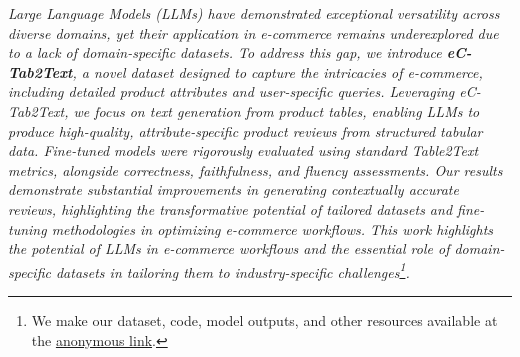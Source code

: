 \textit{Large Language Models (LLMs) have demonstrated exceptional versatility across diverse domains, yet their application in e-commerce remains underexplored due to a lack of domain-specific datasets. To address this gap, we introduce \textbf{eC-Tab2Text}, a novel dataset designed to capture the intricacies of e-commerce, including detailed product attributes and user-specific queries. Leveraging eC-Tab2Text, we focus on text generation from product tables, enabling LLMs to produce high-quality, attribute-specific product reviews from structured tabular data. Fine-tuned models were rigorously evaluated using standard Table2Text metrics, alongside correctness, faithfulness, and fluency assessments. Our results demonstrate substantial improvements in generating contextually accurate reviews, highlighting the transformative potential of tailored datasets and fine-tuning methodologies in optimizing e-commerce workflows. This work highlights the potential of LLMs in e-commerce workflows and the essential role of domain-specific datasets in tailoring them to industry-specific challenges\footnote{We make our dataset, code, model outputs, and other resources available at the \href{https://anonymous.4open.science/r/eC-Tab2Text-EE31}{anonymous link}.}.}
